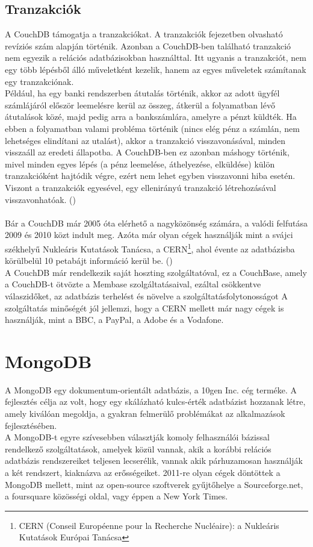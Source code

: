 		\subsection{Tranzakciók}
			A CouchDB támogatja a tranzakciókat. A tranzakciók  fejezetben olvasható revíziós szám alapján történik. Azonban a CouchDB-ben található tranzakció nem egyezik a relációs adatbázisokban használttal. Itt ugyanis a tranzakciót, nem egy több lépésből álló műveletként kezelik, hanem az egyes műveletek számítanak egy tranzakciónak. \\Például, ha egy banki rendszerben átutalás történik, akkor az adott ügyfél számlájáról először leemelésre kerül az összeg, átkerül a folyamatban lévő átutalások közé, majd pedig arra a bankszámlára, amelyre a pénzt küldték. Ha ebben a folyamatban valami probléma történik (nincs elég pénz a számlán, nem lehetséges elindítani az utalást), akkor a tranzakció visszavonásával, minden visszaáll az eredeti állapotba. A CouchDB-ben ez azonban máshogy történik, mivel minden egyes lépés (a pénz leemelése, áthelyezése, elküldése) külön tranzakcióként hajtódik végre, ezért nem lehet egyben visszavonni hiba esetén. Viszont a tranzakciók egyesével, egy ellenirányú tranzakció létrehozásával visszavonhatóak. ()
	\hfill\\\hfill\\
	Bár a CouchDB már 2005 óta elérhető a nagyközönség számára, a valódi felfutása 2009 és 2010 közt indult meg. Azóta már olyan cégek használják mint a svájci székhelyű Nukleáris Kutatások Tanácsa, a CERN\footnote{CERN (Conseil Européenne pour la Recherche Nucléaire): a Nukleáris Kutatások Európai Tanácsa}, ahol évente az adatbázisba körülbelül 10 petabájt információ kerül be. ()\\
	A CouchDB már rendelkezik saját hoszting szolgáltatóval, ez a CouchBase, amely a CouchDB-t ötvözte a Membase szolgáltatásaival, ezáltal csökkentve válaszidőket, az adatbázis terhelést és növelve a szolgáltatásfolytonosságot A szolgáltatás minőségét jól jellemzi, hogy a CERN mellett már nagy cégek is használják, mint a BBC, a PayPal, a Adobe és a Vodafone.
\section{MongoDB}
\label{sec:mongodb}
	
	A MongoDB egy dokumentum-orientált adatbázis, a 10gen Inc. cég terméke. A fejlesztés célja az volt, hogy egy skálázható kulcs-érték adatbázist hozzanak létre, amely kiválóan megoldja, a gyakran felmerülő problémákat az alkalmazások fejlesztésében.\\
	A MongoDB-t egyre szívesebben választják komoly felhasználói bázissal rendelkező szolgáltatások, amelyek közül vannak, akik a korábbi relációs adatbázis rendszereiket teljesen lecserélik, vannak akik párhuzamosan használják a két rendszert, kiaknázva az erősségeiket. 2011-re olyan cégek döntöttek a MongoDB mellett, mint az open-source szoftverek gyűjtőhelye a Sourceforge.net, a foursquare közösségi oldal, vagy éppen a New York Times.
	
